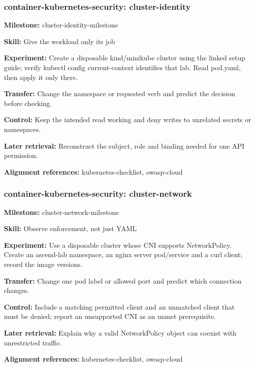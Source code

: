 \subsubsection{container-kubernetes-security: cluster-identity}
\noindent\textbf{Milestone:} cluster-identity-milestone\par
\noindent\textbf{Skill:} Give the workload only its job\par
\noindent\textbf{Experiment:} Create a disposable kind/minikube cluster using the linked setup guide; verify kubectl config current-context identifies that lab. Read pod.yaml, then apply it only there.\par
\noindent\textbf{Transfer:} Change the namespace or requested verb and predict the decision before checking.\par
\noindent\textbf{Control:} Keep the intended read working and deny writes to unrelated secrets or namespaces.\par
\noindent\textbf{Later retrieval:} Reconstruct the subject, role and binding needed for one API permission.\par
\noindent\textbf{Alignment references:} kubernetes-checklist, owasp-cloud\par
\subsubsection{container-kubernetes-security: cluster-network}
\noindent\textbf{Milestone:} cluster-network-milestone\par
\noindent\textbf{Skill:} Observe enforcement, not just YAML\par
\noindent\textbf{Experiment:} Use a disposable cluster whose CNI supports NetworkPolicy. Create an ascend-lab namespace, an nginx server pod/service and a curl client; record the image versions.\par
\noindent\textbf{Transfer:} Change one pod label or allowed port and predict which connection changes.\par
\noindent\textbf{Control:} Include a matching permitted client and an unmatched client that must be denied; report an unsupported CNI as an unmet prerequisite.\par
\noindent\textbf{Later retrieval:} Explain why a valid NetworkPolicy object can coexist with unrestricted traffic.\par
\noindent\textbf{Alignment references:} kubernetes-checklist, owasp-cloud\par
